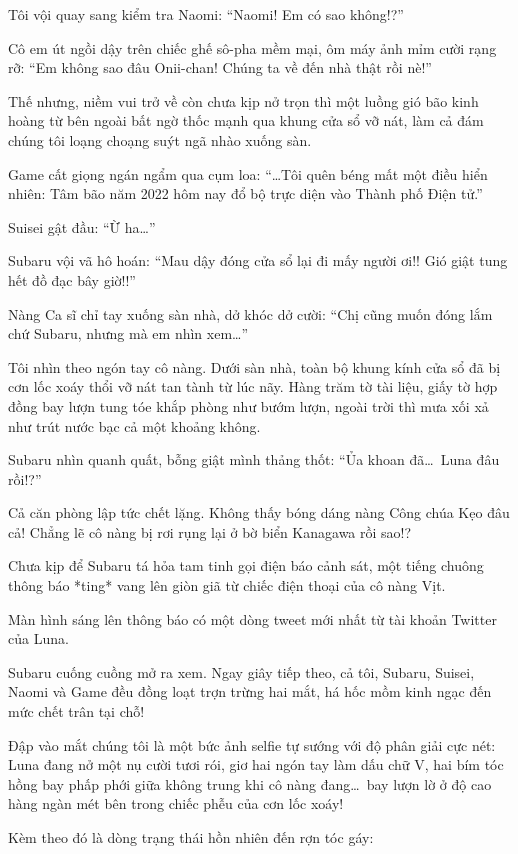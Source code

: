 \documentclass[../main.tex]{subfiles}
\begin{document}
Tôi vội quay sang kiểm tra Naomi: ``Naomi! Em có sao không!?''

Cô em út ngồi dậy trên chiếc ghế sô-pha mềm mại, ôm máy ảnh mỉm cười rạng rỡ: ``Em không sao đâu Onii-chan! Chúng ta về đến nhà thật rồi nè!''

Thế nhưng, niềm vui trở về còn chưa kịp nở trọn thì một luồng gió bão kinh hoàng từ bên ngoài bất ngờ thốc mạnh qua khung cửa sổ vỡ nát, làm cả đám chúng tôi loạng choạng suýt ngã nhào xuống sàn.

Game cất giọng ngán ngẩm qua cụm loa: ``\dots Tôi quên béng mất một điều hiển nhiên: Tâm bão năm 2022 hôm nay đổ bộ trực diện vào Thành phố Điện tử.''

Suisei gật đầu: ``Ừ ha\dots''

Subaru vội vã hô hoán: ``Mau dậy đóng cửa sổ lại đi mấy người ơi!! Gió giật tung hết đồ đạc bây giờ!!''

Nàng Ca sĩ chỉ tay xuống sàn nhà, dở khóc dở cười: ``Chị cũng muốn đóng lắm chứ Subaru, nhưng mà em nhìn xem\dots''

Tôi nhìn theo ngón tay cô nàng. Dưới sàn nhà, toàn bộ khung kính cửa sổ đã bị cơn lốc xoáy thổi vỡ nát tan tành từ lúc nãy. Hàng trăm tờ tài liệu, giấy tờ hợp đồng bay lượn tung tóe khắp phòng như bướm lượn, ngoài trời thì mưa xối xả như trút nước bạc cả một khoảng không.

Subaru nhìn quanh quất, bỗng giật mình thảng thốt: ``Ủa khoan đã\dots\ Luna đâu rồi!?''

Cả căn phòng lập tức chết lặng. Không thấy bóng dáng nàng Công chúa Kẹo đâu cả! Chẳng lẽ cô nàng bị rơi rụng lại ở bờ biển Kanagawa rồi sao!?

Chưa kịp để Subaru tá hỏa tam tinh gọi điện báo cảnh sát, một tiếng chuông thông báo *ting* vang lên giòn giã từ chiếc điện thoại của cô nàng Vịt.

Màn hình sáng lên thông báo có một dòng tweet mới nhất từ tài khoản Twitter của Luna.

Subaru cuống cuồng mở ra xem. Ngay giây tiếp theo, cả tôi, Subaru, Suisei, Naomi và Game đều đồng loạt trợn trừng hai mắt, há hốc mồm kinh ngạc đến mức chết trân tại chỗ!

Đập vào mắt chúng tôi là một bức ảnh selfie tự sướng với độ phân giải cực nét: Luna đang nở một nụ cười tươi rói, giơ hai ngón tay làm dấu chữ V, hai bím tóc hồng bay phấp phới giữa không trung khi cô nàng đang\dots\ bay lượn lờ ở độ cao hàng ngàn mét bên trong chiếc phễu của cơn lốc xoáy!

Kèm theo đó là dòng trạng thái hồn nhiên đến rợn tóc gáy:
\end{document}
